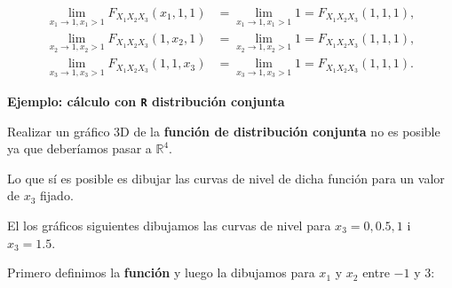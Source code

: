 \documentclass[
  letterpaper,
  DIV=11,
  numbers=noendperiod]{scrreprt}
\begin{document}
\[
\begin{array}{rl}
 \lim_{x_1\to 1,x_1> 1} F_{X_1X_2X_3}(x_1,1,1) & =\lim_{x_1\to 1,x_1> 1} 1  = F_{X_1X_2X_3}(1,1,1),\\
 \lim_{x_2\to 1,x_2> 1} F_{X_1X_2X_3}(1,x_2,1) & =\lim_{x_2\to 1,x_2> 1} 1 = F_{X_1X_2X_3}(1,1,1),\\  
\lim_{x_3\to 1,x_3> 1} F_{X_1X_2X_3}(1,1,x_3) & =\lim_{x_3\to 1,x_3> 1} 1  = F_{X_1X_2X_3}(1,1,1).
\end{array}
\]

\textbf{Ejemplo: cálculo con \texttt{R} distribución conjunta}

Realizar un gráfico 3D de la \textbf{función de distribución conjunta}
no es posible ya que deberíamos pasar a \(\mathbb{R}^4\).

Lo que sí es posible es dibujar las curvas de nivel de dicha función
para un valor de \(x_3\) fijado.

El los gráficos siguientes dibujamos las curvas de nivel para
\(x_3=0,0.5,1\) i \(x_3=1.5\).

Primero definimos la \textbf{función} y luego la dibujamos para \(x_1\)
y \(x_2\) entre \(-1\) y \(3\):
\end{document}
